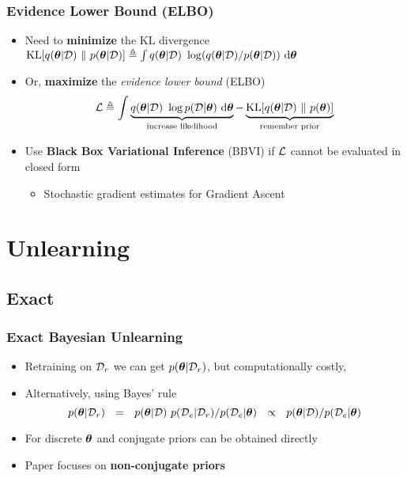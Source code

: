 \documentclass[pdf]{beamer}
\begin{document}
\begin{frame}
  \frametitle{Evidence Lower Bound (ELBO)}
  \begin{itemize}
    \item Need to \textbf{minimize} the KL divergence $\text{KL}[q(\bm{\theta}|\mathcal{D})\ \Vert\  p(\bm{\theta}|\mathcal{D})] \triangleq \int q(\bm{\theta}|\mathcal{D})\ \log (q(\bm{\theta}|\mathcal{D}) / p(\bm{\theta}|\mathcal{D}))\ \text{d}\bm{\theta}$
    \item Or, \textbf{maximize} the \emph{evidence lower bound} (ELBO) 
    \[
      \mathcal{L} \triangleq \int \underbrace{q(\bm{\theta}|\mathcal{D})\ \log p(\mathcal{D} | \bm{\theta})\ \text{d}\bm{\theta}}_{\text{increase likelihood}} - \underbrace{\text{KL}[q(\bm{\theta}|\mathcal{D})\ \Vert\ p(\bm{\theta})]}_{\text{remember prior}}
    \]
    \item Use \textbf{Black Box Variational Inference} (BBVI) if  $\mathcal{L}$ cannot be evaluated in closed form
    \begin{itemize}
      \item Stochastic gradient estimates for Gradient Ascent
    \end{itemize}
  \end{itemize}
\end{frame}

\section{Unlearning}
\subsection{Exact}
\begin{frame}
  \frametitle{Exact Bayesian Unlearning}
  \begin{itemize}
    \item Retraining on $\mathcal{D}_r$ we can get $p(\bm{\theta}|\mathcal{D}_r)$, but computationally costly,
    \item Alternatively, using Bayes' rule 
    \[
      p(\bm{\theta}|\mathcal{D}_r)\ \ =\ \  {p(\bm{\theta}|\mathcal{D}) \ p(\mathcal{D}_e|\mathcal{D}_r)}/{p(\mathcal{D}_e| \bm{\theta})}
	\ \ \propto\ \  {p(\bm{\theta}|\mathcal{D})}/{p(\mathcal{D}_e| \bm{\theta})} 
    \]
    \item For discrete $\boldsymbol{\theta}$ and conjugate priors can be obtained directly
    \item Paper focuses on \textbf{non-conjugate priors}
  \end{itemize}
  

\end{frame}
\end{document}
